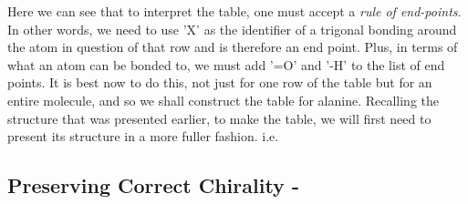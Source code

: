 \documentclass[a4paper,10pt]{article}
\begin{document}
\begin{table}[h!]
\captionsetup{justification=centering}
\noindent{}
\caption{\small{Example of Trigonal Table Row}}
\label{tab:btrir}
\end{table}

Here we can see that to interpret the table, one must accept a \textit{rule of end-points}. In other words, we need to use 'X' as the identifier of a trigonal bonding around the atom in question of that row and is therefore an end point. Plus, in terms of what an atom can be bonded to, we must add '=O' and '-H' to the list of end points. It is best now to do this, not just for one row of the table but for an entire molecule, and so we shall construct the table for alanine. Recalling the structure that was presented earlier, to make the table, we will first need to present its structure in a more fuller fashion. i.e.

\begin{center}
\footnotesize{
}
\end{center}

\begin{center}
 
\end{center}

\subsection{Preserving Correct Chirality -}
\end{document}
